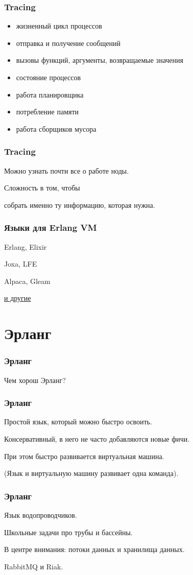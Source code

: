 \documentclass[10pt]{beamer}
\begin{document}
\begin{frame}
\frametitle{Tracing}
\begin{itemize}
\item жизненный цикл процессов
\item отправка и получение сообщений
\item вызовы функций, аргументы, возвращаемые значения
\item состояние процессов
\item работа планировщика
\item потребление памяти
\item работа сборщиков мусора
\end{itemize}
\end{frame}

\begin{frame}
\frametitle{Tracing}
\centering
Можно узнать почти все о работе ноды.
\par \bigskip
Сложность в том, чтобы
\par
собрать именно ту информацию, которая нужна.
\end{frame}

\begin{frame}
\frametitle{Языки для Erlang VM}
\centering
Erlang, Elixir
\par \bigskip
Joxa, LFE
\par \bigskip
Alpaca, Gleam
\par \bigskip
\textcolor{blue}{\href{https://github.com/llaisdy/beam_languages}{и другие}}
\end{frame}


\section{Эрланг}

\begin{frame}
\frametitle{Эрланг}
\centering
Чем хорош Эрланг?
\end{frame}

\begin{frame}
\frametitle{Эрланг}
\centering
Простой язык, который можно быстро освоить.
\par \bigskip
Консервативный, в него не часто добавляются новые фичи.
\par \bigskip
При этом быстро развивается виртуальная машина.
\par \bigskip
(Язык и виртуальную машину развивает одна команда).
\end{frame}

\begin{frame}
\frametitle{Эрланг}
\centering
Язык водопроводчиков.
\par \bigskip
Школьные задачи про трубы и бассейны.
\par \bigskip
В центре внимания: потоки данных и хранилища данных.
\par \bigskip
RabbitMQ и Riak.
\end{frame}
\end{document}
